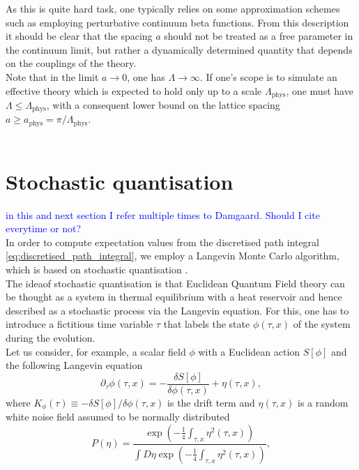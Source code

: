 As this is quite hard task, one typically relies on some approximation schemes such as employing perturbative continuum beta functions. From this description it should be clear that the spacing $a$ should not be treated as a free parameter in the continuum limit, but rather a dynamically determined quantity that depends on the couplings of the theory. \\
Note that in the limit $a \to 0$, one has $\Lambda \to \infty$. If one's scope is to simulate an effective theory which is expected to hold only up to a scale $\Lambda_\text{phys}$, one must have $\Lambda \leq \Lambda_\text{phys}$, with a consequent lower bound on the lattice spacing $a \geq a_\text{phys} = \pi / \Lambda_\text{phys}$. \\ ~

\section{Stochastic quantisation}
\textcolor{blue}{in this and next section I refer multiple times to Damgaard. Should I cite everytime or not?}\\ In order to compute expectation values from the discretised path integral \eqref{eq:discretised_path_integral}, we employ a Langevin Monte Carlo algorithm, which is based on stochastic quantisation \cite{ParisiWu, Damgaard1987StochasticQuantization}. \\
The ideaof stochastic quantisation \cite{ParisiWu,Damgaard1987StochasticQuantization} is that Euclidean Quantum Field theory can be thought as a system in thermal equilibrium with a heat reservoir and hence described as a stochastic process via the Langevin equation. For this, one has to introduce a fictitious time variable $\tau$ that labels the state $\phi(\tau, x)$ of the system 
during the evolution. \\
Let us consider, for example, a scalar field $\phi$ with a Euclidean action $S[\phi]$ and the following Langevin equation
\begin{equation}
    \partial_\tau \phi(\tau, x) = - \frac{\delta S[\phi]}{\delta \phi (\tau, x)} + \eta (\tau, x),
    \label{eq:Langevin_scalar_full}
\end{equation}
where $K_{\phi}(\tau) \equiv -\delta S[\phi]/\delta \phi (\tau, x)$ is the drift term and $\eta (\tau, x)$ is a random white noise field assumed to be normally distributed
\begin{equation*}
    P(\eta) = \frac{\exp\left(-\frac{1}{4}\int_{\tau,x} \eta^2(\tau, x)\right)}{\int D\eta \exp\left(-\frac{1}{4}\int_{\tau,x} \eta^2(\tau,x)\right)},
\end{equation*} 
